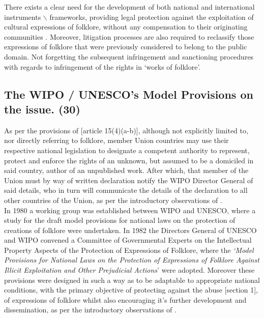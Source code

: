 \documentclass[11pt]{article}
\begin{document}
There exists a clear need for the development of both national and international
instruments $\backslash$ frameworks, providing legal protection against the exploitation of
cultural expressions of folklore, without any compensation to their originating
communities \cite{saurombe09_protection_indigenous_trad_knowl_through_ip}. Moreover, litigation processes are also required to reclassify
those expressions of folklore that were previously considered to belong to the
public domain. Not forgetting the subsequent infringement and sanctioning
procedures with regards to infringement of the rights in `works of folklore'.

\subsection{The WIPO / UNESCO's Model Provisions on the issue. (30)}
\label{sec:org1d3fd15}

As per the provisions of [article 15(4)(a-b)]\cite{wipo86_berne}, although not
explicitly limited to, nor directly referring to folklore, member Union
countries may use their respective national legislation to designate a competent
authority to represent, protect and enforce the rights of an unknown, but
assumed to be a domiciled in said country, author of an unpublished work.
After which, that member of the Union must by way of written declaration notify
the WIPO Director General of said details, who in turn will communicate the
details of the declaration to all other countries of the Union, as per the
introductory observations of \cite{wipo85_model_provi_national_laws_folklore}.\\

In 1980 a working group was established between WIPO and UNESCO, where a study
for the draft model provisions for national laws on the protection of creations
of folklore were undertaken. In 1982 the Directors General of UNESCO and WIPO
convened a Committee of Governmental Experts on the Intellectual Property
Aspects of the Protection of Expressions of Folklore, where the \emph{`Model Provisions for National Laws on the Protection of Expressions of Folklore
Against Illicit Exploitation and Other Prejudicial Actions}' were adopted.
Moreover these provisions were designed in such a way as to be adaptable to
appropriate national conditions, with the primary objective of protecting
against the abuse [section 1]\cite{wipo85_model_provi_national_laws_folklore}, of
expressions of folklore whilst also encouraging it's further development and
dissemination, as per the introductory observations of
\cite{wipo85_model_provi_national_laws_folklore}.\\
\end{document}
